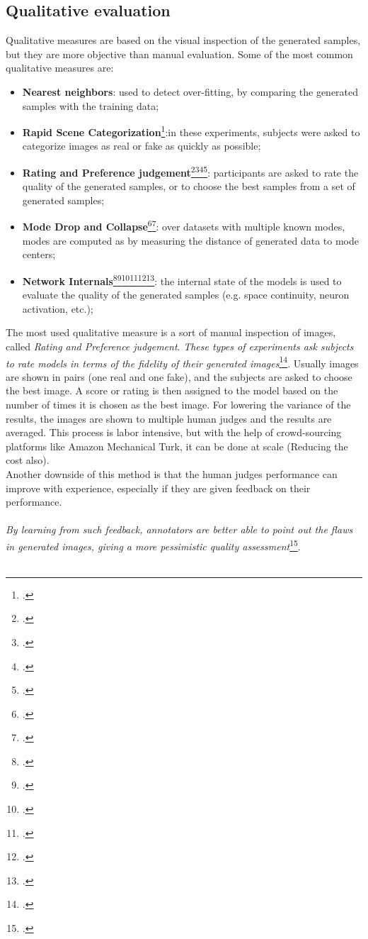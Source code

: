 \subsection{Qualitative evaluation}
\label{subsec:qualitative-evaluation}
Qualitative measures are based on the visual inspection of the generated samples, but they are more objective than manual evaluation.
Some of the most common qualitative measures are:
\begin{itemize}
    \item \textbf{Nearest neighbors}: used to detect over-fitting, by comparing the generated samples with the training data;
    \item \textbf{Rapid Scene Categorization}\footcite{paper:ganpaper}:in these experiments, subjects were asked to categorize images as real or fake as quickly as possible;
    \item \textbf{Rating and Preference judgement}\footcite{paper:stackadvnet}\footcite{paper:stackadvnet1}\footcite{paper:stackadvnet2}\footcite{paper:stackadvnet3}: 
    participants are asked to rate the quality of the generated samples, or to choose the best samples from a set of generated samples;
    \item \textbf{Mode Drop and Collapse}\footcite{paper:dropandcollapse}\footcite{paper:dropandcollapse2}: over datasets with multiple known modes, modes are computed as by measuring the distance of generated data to mode centers;
    \item \textbf{Network Internals}\footcite{paper:netint}\footcite{paper:netint1}\footcite{paper:netint2}\footcite{paper:netint3}\footcite{paper:netint4}\footcite{paper:netint5}: 
    the internal state of the models is used to evaluate the quality of the generated samples (e.g. space continuity, neuron activation, etc.);
\end{itemize}
The most used qualitative measure is a sort of manual inspection of images, called \emph{Rating and Preference judgement}.
\emph{These types of experiments ask subjects to rate models in terms of the fidelity of their generated images}\footcite{paper:ganeval}.
Usually images are shown in pairs (one real and one fake), and the subjects are asked to choose the best image.
A score or rating is then assigned to the model based on the number of times it is chosen as the best image.
For lowering the variance of the results, the images are shown to multiple human judges and the results are averaged.
This process is labor intensive, but with the help of crowd-sourcing platforms like Amazon Mechanical Turk, 
it can be done at scale (Reducing the cost also).\\
Another downside of this method is that the human judges performance can improve with experience, especially if they are given feedback on their performance.\\\\
\emph{By learning from such feedback, annotators are better able to point out the flaws in generated images, giving a more pessimistic quality assessment}\footcite{paper:ganeval}.\\\\

